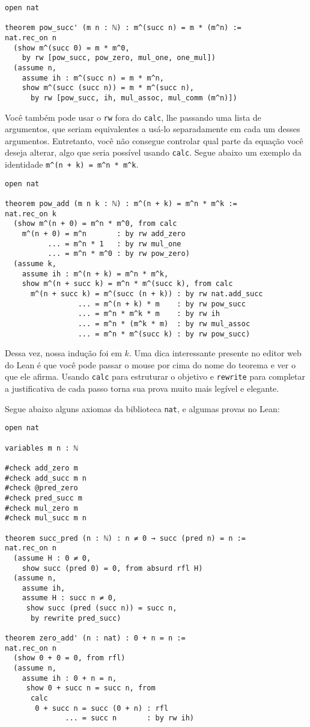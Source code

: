 \begin{lstlisting}
open nat

theorem pow_succ' (m n : ℕ) : m^(succ n) = m * (m^n) :=
nat.rec_on n
  (show m^(succ 0) = m * m^0,
    by rw [pow_succ, pow_zero, mul_one, one_mul])
  (assume n,
    assume ih : m^(succ n) = m * m^n,
    show m^(succ (succ n)) = m * m^(succ n),
      by rw [pow_succ, ih, mul_assoc, mul_comm (m^n)])
\end{lstlisting}

Você também pode usar o \lstinline{rw} fora do \lstinline{calc}, lhe passando uma lista de argumentos, que seriam equivalentes a usá-lo separadamente em cada um desses argumentos.
Entretanto, você não consegue controlar qual parte da equação você deseja alterar, algo que seria possível usando \lstinline{calc}. Segue abaixo um exemplo da identidade \lstinline{m^(n + k) = m^n * m^k}.

\begin{lstlisting}
open nat

theorem pow_add (m n k : ℕ) : m^(n + k) = m^n * m^k :=
nat.rec_on k
  (show m^(n + 0) = m^n * m^0, from calc
    m^(n + 0) = m^n       : by rw add_zero
          ... = m^n * 1   : by rw mul_one
          ... = m^n * m^0 : by rw pow_zero)
  (assume k,
    assume ih : m^(n + k) = m^n * m^k,
    show m^(n + succ k) = m^n * m^(succ k), from calc
      m^(n + succ k) = m^(succ (n + k)) : by rw nat.add_succ
                 ... = m^(n + k) * m    : by rw pow_succ
                 ... = m^n * m^k * m    : by rw ih
                 ... = m^n * (m^k * m)  : by rw mul_assoc
                 ... = m^n * m^(succ k) : by rw pow_succ)
\end{lstlisting}

Dessa vez, nossa indução foi em $k$. Uma dica interessante presente no editor web do Lean é que você pode passar o mouse por cima do nome do teorema e ver o que ele afirma. Usando \lstinline{calc} para estruturar o objetivo e \lstinline{rewrite} para completar a justificativa de cada passo torna sua prova muito mais legível e elegante.

Segue abaixo alguns axiomas da biblioteca \lstinline{nat}, e algumas provas no Lean:

\begin{lstlisting}
open nat

variables m n : ℕ

#check add_zero m
#check add_succ m n
#check @pred_zero
#check pred_succ m
#check mul_zero m
#check mul_succ m n

theorem succ_pred (n : ℕ) : n ≠ 0 → succ (pred n) = n :=
nat.rec_on n
  (assume H : 0 ≠ 0,
    show succ (pred 0) = 0, from absurd rfl H)
  (assume n,
    assume ih,
    assume H : succ n ≠ 0,
     show succ (pred (succ n)) = succ n,
      by rewrite pred_succ)

theorem zero_add' (n : nat) : 0 + n = n :=
nat.rec_on n
  (show 0 + 0 = 0, from rfl)
  (assume n,
    assume ih : 0 + n = n,
     show 0 + succ n = succ n, from
      calc
       0 + succ n = succ (0 + n) : rfl
              ... = succ n       : by rw ih)
\end{lstlisting}

